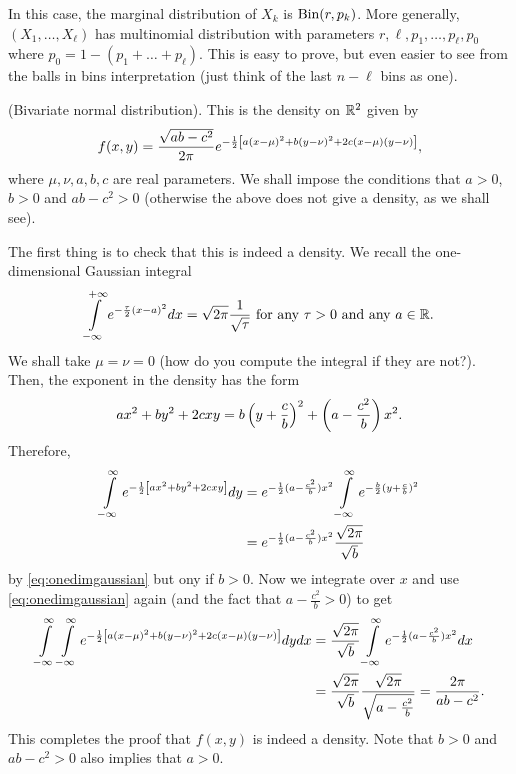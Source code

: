 \documentclass[preprint,  11pt]{amsart}
\begin{document}
In this case, the marginal distribution of $X_{k}$ is $\mbox{Bin}(r,p_{k})$. More generally, $(X_{1},\ldots ,X_{\ell})$ has multinomial distribution with parameters $r,\ell,p_{1},\ldots ,p_{\ell},p_{0}$ where $p_{0}=1-(p_{1}+\ldots +p_{\ell})$. This is easy to prove, but even easier to see from the balls in bins interpretation (just think of the last $n-\ell$ bins as one).
\eeg

\beg (Bivariate normal distribution). This is the density on $\mathbb{R}^{2}$ given by
$$
f(x,y)=\frac{\sqrt{ab-c^{2}}}{2\pi}e^{-\frac{1}{2}\left[a(x-\mu)^{2}+b(y-\nu)^{2}+2c(x-\mu)(y-\nu) \right]},
$$
where $\mu,\nu,a,b,c$ are real parameters. We shall impose the conditions that $a>0$, $b>0$ and $ab-c^{2}>0$ (otherwise the above does not give a density, as we shall see).

The first thing is to check that this is indeed a density. We recall the one-dimensional Gaussian integral
\begin{equation}\label{eq:onedimgaussian}
\int\limits_{-\infty}^{+\infty}e^{-\frac{\tau}{2}(x-a)^{2}}dx = \sqrt{2\pi}\frac{1}{\sqrt{\tau}} \mbox{ for any }\tau>0 \mbox{ and any }a\in \mathbb{R}.
\end{equation}
We shall take $\mu=\nu=0$ (how do you compute the integral  if they are not?). Then, the exponent in the density has the form
$$
ax^{2}+by^{2}+2cxy = b\left(y+\frac{c}{b}\right)^{2}+\left(a-\frac{c^{2}}{b}\right)x^{2}.
$$
Therefore,
\begin{align*}
\int\limits_{-\infty}^{\infty}e^{-\frac{1}{2}\left[ax^{2}+by^{2}+2cxy \right]} dy &= e^{-\frac{1}{2}(a-\frac{c^{2}}{b})x^{2}} \int\limits_{-\infty}^{\infty}e^{-\frac{b}{2}(y+\frac{c}{b})^{2}} \\
&= e^{-\frac{1}{2}(a-\frac{c^{2}}{b})x^{2}}\frac{\sqrt{2\pi}}{\sqrt{b}}
\end{align*}
by \eqref{eq:onedimgaussian} but ony if $b>0$. Now we integrate over $x$ and use \eqref{eq:onedimgaussian} again (and the fact that $a-\frac{c^{2}}{b}>0$) to get
\begin{align*}
\int\limits_{-\infty}^{\infty}\int\limits_{-\infty}^{\infty}e^{-\frac{1}{2}\left[a(x-\mu)^{2}+b(y-\nu)^{2}+2c(x-\mu)(y-\nu) \right]}dydx &= \frac{\sqrt{2\pi}}{\sqrt{b}} \int\limits_{-\infty}^{\infty} e^{-\frac{1}{2}(a-\frac{c^{2}}{b})x^{2}}dx \\
&= \frac{\sqrt{2\pi}}{\sqrt{b}} \frac{\sqrt{2\pi}}{\sqrt{a-\frac{c^{2}}{b}}} = \frac{2\pi}{ab-c^{2}}.
\end{align*}
This completes the proof that $f(x,y)$ is indeed a density. Note that $b>0$ and $ab-c^{2}>0$ also implies that $a>0$.
\eeg
\end{document}
